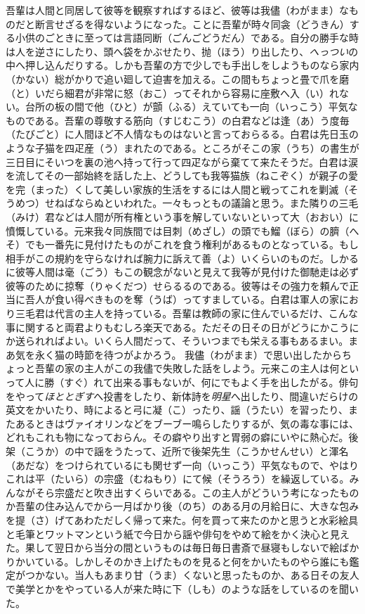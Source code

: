 \documentclass{book}
\begin{document}
吾輩は人間と同居して彼等を観察すればするほど、彼等は我儘（わがまま）なものだと断言せざるを得ないようになった。ことに吾輩が時々同衾（どうきん）する小供のごときに至っては言語同断（ごんごどうだん）である。自分の勝手な時は人を逆さにしたり、頭へ袋をかぶせたり、抛（ほう）り出したり、\emph{へっつい}の中へ押し込んだりする。しかも吾輩の方で少しでも手出しをしようものなら家内（かない）総がかりで追い廻して迫害を加える。この間もちょっと畳で爪を磨（と）いだら細君が非常に怒（おこ）ってそれから容易に座敷へ入（い）れない。台所の板の間で他（ひと）が顫（ふる）えていても一向（いっこう）平気なものである。吾輩の尊敬する筋向（すじむこう）の白君などは逢（あ）う度毎（たびごと）に人間ほど不人情なものはないと言っておらるる。白君は先日玉のような子猫を四疋産（う）まれたのである。ところがそこの家（うち）の書生が三日目にそいつを裏の池へ持って行って四疋ながら棄てて来たそうだ。白君は涙を流してその一部始終を話した上、どうしても我等猫族（ねこぞく）が親子の愛を完（まった）くして美しい家族的生活をするには人間と戦ってこれを剿滅（そうめつ）せねばならぬといわれた。一々もっともの議論と思う。また隣りの三毛（みけ）君などは人間が所有権という事を解していないといって大（おおい）に憤慨している。元来我々同族間では目刺（めざし）の頭でも鰡（ぼら）の臍（へそ）でも一番先に見付けたものがこれを食う権利があるものとなっている。もし相手がこの規約を守らなければ腕力に訴えて善（よ）いくらいのものだ。しかるに彼等人間は毫（ごう）もこの観念がないと見えて我等が見付けた御馳走は必ず彼等のために掠奪（りゃくだつ）せらるるのである。彼等はその強力を頼んで正当に吾人が食い得べきものを奪（うば）ってすましている。白君は軍人の家におり三毛君は代言の主人を持っている。吾輩は教師の家に住んでいるだけ、こんな事に関すると両君よりもむしろ楽天である。ただその日その日がどうにかこうにか送られればよい。いくら人間だって、そういつまでも栄える事もあるまい。まあ気を永く猫の時節を待つがよかろう。
我儘（わがまま）で思い出したからちょっと吾輩の家の主人がこの我儘で失敗した話をしよう。元来この主人は何といって人に勝（すぐ）れて出来る事もないが、何にでもよく手を出したがる。俳句をやって\emph{ほととぎす}へ投書をしたり、新体詩を\emph{明星}へ出したり、間違いだらけの英文をかいたり、時によると弓に凝（こ）ったり、謡（うたい）を習ったり、またあるときはヴァイオリンなどをブーブー鳴らしたりするが、気の毒な事には、どれもこれも物になっておらん。その癖やり出すと胃弱の癖にいやに熱心だ。後架（こうか）の中で謡をうたって、近所で後架先生（こうかせんせい）と渾名（あだな）をつけられているにも関せず一向（いっこう）平気なもので、やはりこれは平（たいら）の宗盛（むねもり）にて候（そうろう）を繰返している。みんながそら宗盛だと吹き出すくらいである。この主人がどういう考になったものか吾輩の住み込んでから一月ばかり後（のち）のある月の月給日に、大きな包みを提（さ）げてあわただしく帰って来た。何を買って来たのかと思うと水彩絵具と毛筆とワットマンという紙で今日から謡や俳句をやめて絵をかく決心と見えた。果して翌日から当分の間というものは毎日毎日書斎で昼寝もしないで絵ばかりかいている。しかしそのかき上げたものを見ると何をかいたものやら誰にも鑑定がつかない。当人もあまり甘（うま）くないと思ったものか、ある日その友人で美学とかをやっている人が来た時に下（しも）のような話をしているのを聞いた。
\end{document}
